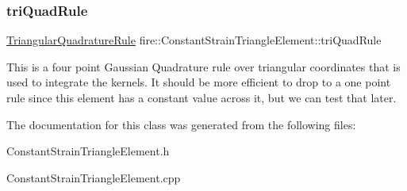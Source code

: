 \subsubsection{\texorpdfstring{tri\+Quad\+Rule}{triQuadRule}}
{\footnotesize\ttfamily \hyperlink{a00856}{Triangular\+Quadrature\+Rule} fire\+::\+Constant\+Strain\+Triangle\+Element\+::tri\+Quad\+Rule\hspace{0.3cm}{\ttfamily [protected]}}

This is a four point Gaussian Quadrature rule over triangular coordinates that is used to integrate the kernels. It should be more efficient to drop to a one point rule since this element has a constant value across it, but we can test that later. 

The documentation for this class was generated from the following files\+:\begin{DoxyCompactItemize}
\item 
Constant\+Strain\+Triangle\+Element.\+h\item 
Constant\+Strain\+Triangle\+Element.\+cpp\end{DoxyCompactItemize}

